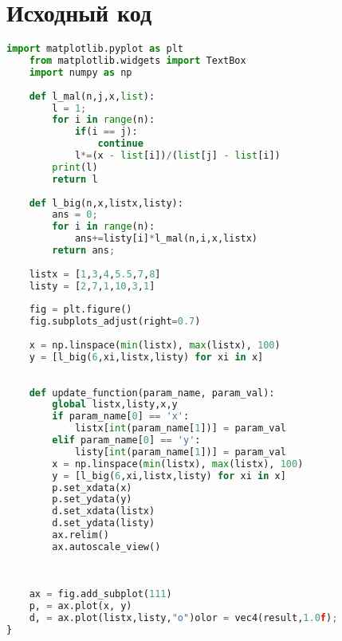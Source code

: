 \section{Исходный код}

\begin{lstlisting}[language=Python]
    import matplotlib.pyplot as plt
    from matplotlib.widgets import TextBox
    import numpy as np
    
    def l_mal(n,j,x,list):
        l = 1;
        for i in range(n):
            if(i == j):
                continue
            l*=(x - list[i])/(list[j] - list[i])
        print(l)
        return l
    
    def l_big(n,x,listx,listy):
        ans = 0;
        for i in range(n):
            ans+=listy[i]*l_mal(n,i,x,listx)
        return ans;
    
    listx = [1,3,4,5.5,7,8]
    listy = [2,7,1,10,3,1]
    
    fig = plt.figure()
    fig.subplots_adjust(right=0.7)
    
    x = np.linspace(min(listx), max(listx), 100)
    y = [l_big(6,xi,listx,listy) for xi in x]
    
    
    def update_function(param_name, param_val):
        global listx,listy,x,y
        if param_name[0] == 'x':
            listx[int(param_name[1])] = param_val
        elif param_name[0] == 'y':
            listy[int(param_name[1])] = param_val
        x = np.linspace(min(listx), max(listx), 100)
        y = [l_big(6,xi,listx,listy) for xi in x]
        p.set_xdata(x)
        p.set_ydata(y)
        d.set_xdata(listx)
        d.set_ydata(listy)
        ax.relim()
        ax.autoscale_view()
    
    
    
    ax = fig.add_subplot(111)
    p, = ax.plot(x, y)
    d, = ax.plot(listx,listy,"o")olor = vec4(result,1.0f);
}
\end{lstlisting}




